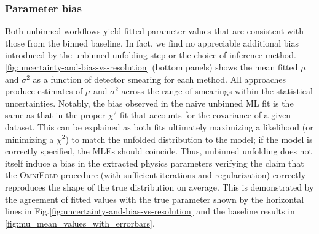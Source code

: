         \subsubsection{Parameter bias}
            Both unbinned workflows yield fitted parameter values that are consistent with those from the binned baseline.
            In fact, we find no appreciable additional bias introduced by the unbinned unfolding step or the choice of inference method.
            \cref{fig:uncertainty-and-bias-vs-resolution} (bottom panels) shows the mean fitted $\mu$ and $\sigma^2$ as a function of detector smearing for each method.
            All approaches produce estimates of $\mu$ and $\sigma^2$ across the range of smearings within the statistical uncertainties.
            Notably, the bias observed in the naive unbinned ML fit is the same as that in the proper $\chi^2$ fit that accounts for the covariance of a given dataset. 
            This can be explained as both fits ultimately maximizing a likelihood (or minimizing a $\chi^2$) to match the unfolded distribution to the model;
            if the model is correctly specified, the MLEs should coincide.
            Thus, unbinned unfolding does not itself induce a bias in the extracted physics parameters verifying the claim that the \textsc{OmniFold} procedure (with sufficient iterations and regularization) correctly reproduces the shape of the true distribution on average.
            This is demonstrated by the agreement of fitted values with the true parameter shown by the horizontal lines in Fig.\cref{fig:uncertainty-and-bias-vs-resolution} and the baseline results in \cref{fig:mu_mean_values_with_errorbars}. 
